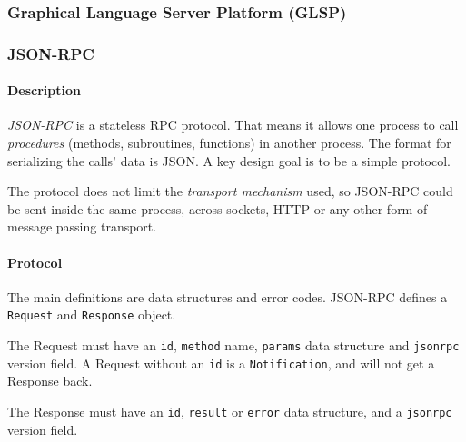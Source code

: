 \subsubsection{Graphical Language Server Platform (GLSP)}\label{sec:glsp}


\subsubsection{JSON-RPC}

\paragraph*{Description}
\emph{JSON-RPC} is a stateless \acrfull{RPC} protocol.
That means it allows one process to call \emph{procedures} (methods, subroutines, functions) in another process.
The format for serializing the calls' data is \gls{JSON}.
A key design goal is to be a simple protocol.~\cite{json-rpcworkinggroupJSONRPCSpecification2010}

The protocol does not limit the \emph{transport mechanism} used, so \gls{JSON-RPC} could be sent inside the same process, across sockets, HTTP or any other form of message passing transport.~\cite{json-rpcworkinggroupJSONRPCSpecification2010}

\paragraph*{Protocol}
The main definitions are data structures and error codes.
\Gls{JSON-RPC} defines a \texttt{Request} and \texttt{Response} object.~\cite{json-rpcworkinggroupJSONRPCSpecification2010}

The Request must have an \texttt{id}, \texttt{method} name, \texttt{params} data structure and \texttt{jsonrpc} version field.
A Request without an \texttt{id} is a \texttt{Notification}, and will not get a Response back.~\cite{json-rpcworkinggroupJSONRPCSpecification2010}

The Response must have an \texttt{id}, \texttt{result} or \texttt{error} data structure, and a \texttt{jsonrpc} version field.~\cite{json-rpcworkinggroupJSONRPCSpecification2010}
